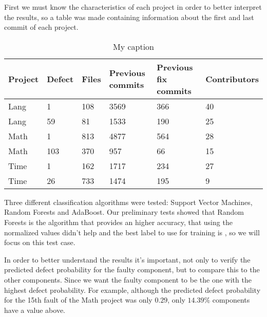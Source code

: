 First we must know the characteristics of each project in order to better interpret the results, so a table was made containing information about the first and last commit of each
project.
%
\begin{table}[H]
\centering
\begin{tabular}{|l|l|l|l|l|l|}
\hline
\textbf{Project} & \textbf{Defect} & \textbf{Files} & \textbf{Previous commits} & \textbf{Previous fix commits} & \textbf{Contributors} \\ \hline
Lang             & 1               & 108            & 3569                      & 366                           & 40                    \\ \hline
Lang             & 59              & 81             & 1533                      & 190                           & 25                    \\ \hline
Math             & 1               & 813            & 4877                      & 564                           & 28                    \\ \hline
Math             & 103             & 370            & 957                       & 66                            & 15                    \\ \hline
Time             & 1               & 162            & 1717                      & 234                           & 27                    \\ \hline
Time             & 26              & 733            & 1474                      & 195                           & 9                     \\ \hline
\end{tabular}
\caption{My caption}
\label{my-label}
\end{table}

Three different classification algorithms were tested: Support Vector Machines, Random Forests and AdaBoost.
Our preliminary tests showed that Random Forests is the algorithm that provides an higher accuracy, that using the normalized values didn't help and the best label to use for training is , so we will focus on this test case.

In order to better understand the results it's important, not only to verify the predicted defect probability for the faulty component, but to compare this to the other components.
Since we want the faulty component to be the one with the highest defect probability. For example, although the predicted defect probability for the 15th fault of the Math project was only $0.29$, only $14.39\%$ components have a value above.

